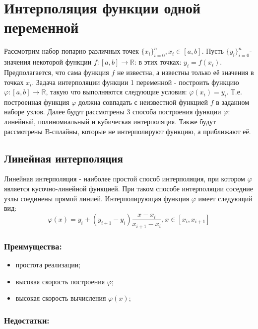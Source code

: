 \section{Интерполяция функции одной переменной}

Рассмотрим набор попарно различных точек $\{x_i\}_{i=0}^n, x_i \in [a, b]$. Пусть $\{y_i\}_{i=0}^n$- значения некоторой функции $f \colon [a,b] \to \mathbb{R}$: в этих точках: $y_i = f(x_i)$. Предполагается, что сама функция $f$ не известна, а известны только её значения в точках $x_i$. Задача интерполяции функции 1 переменной - построить функцию $\varphi \colon [a, b] \to \mathbb{R}$, такую что выполняются следующие условия: $\varphi(x_i) = y_i$. Т.е. построенная функция $\varphi$ должна совпадать с неизвестной функцией $f$ в заданном наборе узлов. Далее будут рассмотрены 3 способа построения функции $\varphi$: линейный, полиномиальный и кубическая интерполяция. Также будут рассмотрены B-сплайны, которые не интерполируют функцию, а приближают её.

\subsection{Линейная интерполяция}

Линейная интерполяция - наиболее простой способ интерполяция, при котором $\varphi$ является кусочно-линейной функцией. При таком способе интерполяции соседние узлы соединены прямой линией. Интерполирующая функция $\varphi$ имеет следующий вид:
\begin{equation}
  \varphi(x) = y_i + (y_{i+1} - y_i) \frac{x-x_i}{x_{i+1} - x_i}, x\in [x_i, x_{i+1}]
\end{equation}

\subsubsection{Преимущества:}
\begin{itemize}
\item простота реализации;

\item высокая скорость построения $\varphi$;

\item высокая скорость вычисления $\varphi(x)$;
\end{itemize}

\subsubsection{Недостатки:}

